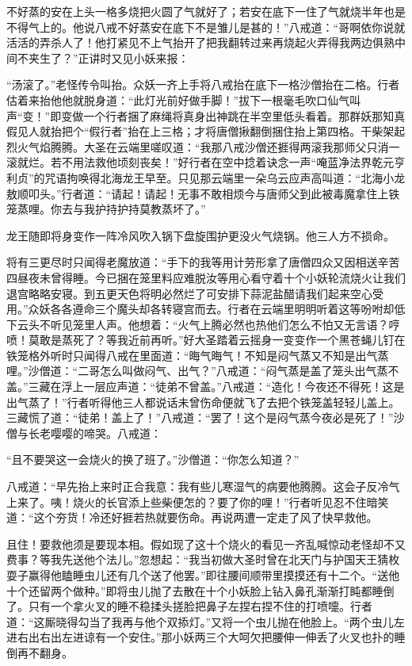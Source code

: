 \documentclass[12pt,UTF8]{ctexbook}
\begin{document}
{	不好蒸的安在上头一格多烧把火圆了气就好了；若安在底下一住了气就烧半年也是不得气上的。他说八戒不好蒸安在底下不是雏儿是甚的！”八戒道：“哥啊依你说就活活的弄杀人了！他打紧见不上气抬开了把我翻转过来再烧起火弄得我两边俱熟中间不夹生了？”正讲时又见小妖来报：
	
	“汤滚了。”老怪传令叫抬。众妖一齐上手将八戒抬在底下一格沙僧抬在二格。行者估着来抬他他就脱身道：“此灯光前好做手脚！”拔下一根毫毛吹口仙气叫声“变！”即变做一个行者捆了麻绳将真身出神跳在半空里低头看着。那群妖那知真假见人就抬把个“假行者”抬在上三格；才将唐僧揪翻倒捆住抬上第四格。干柴架起烈火气焰腾腾。大圣在云端里嗟叹道：“我那八戒沙僧还捱得两滚我那师父只消一滚就烂。若不用法救他顷刻丧矣！”好行者在空中捻着诀念一声“唵蓝净法界乾元亨利贞”的咒语拘唤得北海龙王早至。只见那云端里一朵乌云应声高叫道：“北海小龙敖顺叩头。”行者道：“请起！请起！无事不敢相烦今与唐师父到此被毒魔拿住上铁笼蒸哩。你去与我护持护持莫教蒸坏了。”
	
	龙王随即将身变作一阵冷风吹入锅下盘旋围护更没火气烧锅。他三人方不损命。
	
	将有三更尽时只闻得老魔放道：“手下的我等用计劳形拿了唐僧四众又因相送辛苦四昼夜未曾得睡。今已捆在笼里料应难脱汝等用心看守着十个小妖轮流烧火让我们退宫略略安寝。到五更天色将明必然烂了可安排下蒜泥盐醋请我们起来空心受用。”众妖各各遵命三个魔头却各转寝宫而去。行者在云端里明明听着这等吩咐却低下云头不听见笼里人声。他想着：“火气上腾必然也热他们怎么不怕又无言语？哼喷！莫敢是蒸死了？等我近前再听。”好大圣踏着云摇身一变变作一个黑苍蝇儿钉在铁笼格外听时只闻得八戒在里面道：“晦气晦气！不知是闷气蒸又不知是出气蒸哩。”沙僧道：“二哥怎么叫做闷气、出气？”八戒道：“闷气蒸是盖了笼头出气蒸不盖。”三藏在浮上一层应声道：“徒弟不曾盖。”八戒道：“造化！今夜还不得死！这是出气蒸了！”行者听得他三人都说话未曾伤命便就飞了去把个铁笼盖轻轻儿盖上。三藏慌了道：“徒弟！盖上了！”八戒道：“罢了！这个是闷气蒸今夜必是死了！”沙僧与长老嘤嘤的啼哭。八戒道：
	
	“且不要哭这一会烧火的换了班了。”沙僧道：“你怎么知道？”
	
	八戒道：“早先抬上来时正合我意：我有些儿寒湿气的病要他腾腾。这会子反冷气上来了。咦！烧火的长官添上些柴便怎的？要了你的哩！”行者听见忍不住暗笑道：“这个夯货！冷还好捱若热就要伤命。再说两遭一定走了风了快早救他。
	
	且住！要救他须是要现本相。假如现了这十个烧火的看见一齐乱喊惊动老怪却不又费事？等我先送他个法儿。”忽想起：“我当初做大圣时曾在北天门与护国天王猜枚耍子赢得他瞌睡虫儿还有几个送了他罢。”即往腰间顺带里摸摸还有十二个。“送他十个还留两个做种。”即将虫儿抛了去散在十个小妖脸上钻入鼻孔渐渐打盹都睡倒了。只有一个拿火叉的睡不稳揉头搓脸把鼻子左捏右捏不住的打喷嚏。行者道：“这厮晓得勾当了我再与他个双掭灯。”又将一个虫儿抛在他脸上。“两个虫儿左进右出右出左进谅有一个安住。”那小妖两三个大呵欠把腰伸一伸丢了火叉也扑的睡倒再不翻身。
	
}
\end{document}
